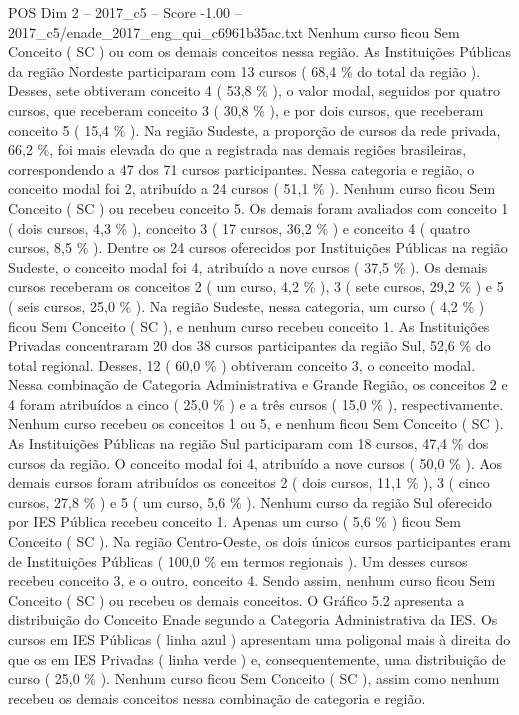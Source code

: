 \begin{textsample}{POS Dim 2 – 2017\_c5 – Score -1.00 – 2017\_c5/enade\_2017\_eng\_qui\_c6961b35ac.txt}
Nenhum curso ficou Sem Conceito ( SC ) ou com os demais conceitos nessa região.
As Instituições Públicas da região Nordeste participaram com 13 cursos ( 68,4 \% do total da região ).
Desses, sete obtiveram conceito 4 ( 53,8 \% ), o valor modal, seguidos por quatro cursos, que receberam conceito 3 ( 30,8 \% ), e por dois cursos, que receberam conceito 5 ( 15,4 \% ).
Na região Sudeste, a proporção de cursos da rede privada, 66,2 \%, foi mais elevada do que a registrada nas demais regiões brasileiras, correspondendo a 47 dos 71 cursos participantes.
Nessa categoria e região, o conceito modal foi 2, atribuído a 24 cursos ( 51,1 \% ).
Nenhum curso ficou Sem Conceito ( SC ) ou recebeu conceito 5.
Os demais foram avaliados com conceito 1 ( dois cursos, 4,3 \% ), conceito 3 ( 17 cursos, 36,2 \% ) e conceito 4 ( quatro cursos, 8,5 \% ).
Dentre os 24 cursos oferecidos por Instituições Públicas na região Sudeste, o conceito modal foi 4, atribuído a nove cursos ( 37,5 \% ).
Os demais cursos receberam os conceitos 2 ( um curso, 4,2 \% ), 3 ( sete cursos, 29,2 \% ) e 5 ( seis cursos, 25,0 \% ).
Na região Sudeste, nessa categoria, um curso ( 4,2 \% ) ficou Sem Conceito ( SC ), e nenhum curso recebeu conceito 1.
As Instituições Privadas concentraram 20 dos 38 cursos participantes da região Sul, 52,6 \% do total regional.
Desses, 12 ( 60,0 \% ) obtiveram conceito 3, o conceito modal.
Nessa combinação de Categoria Administrativa e Grande Região, os conceitos 2 e 4 foram atribuídos a cinco ( 25,0 \% ) e a três cursos ( 15,0 \% ), respectivamente.
Nenhum curso recebeu os conceitos 1 ou 5, e nenhum ficou Sem Conceito ( SC ).
As Instituições Públicas na região Sul participaram com 18 cursos, 47,4 \% dos cursos da região.
O conceito modal foi 4, atribuído a nove cursos ( 50,0 \% ).
Aos demais cursos foram atribuídos os conceitos 2 ( dois cursos, 11,1 \% ), 3 ( cinco cursos, 27,8 \% ) e 5 ( um curso, 5,6 \% ).
Nenhum curso da região Sul oferecido por IES Pública recebeu conceito 1.
Apenas um curso ( 5,6 \% ) ficou Sem Conceito ( SC ).
Na região Centro-Oeste, os dois únicos cursos participantes eram de Instituições Públicas ( 100,0 \% em termos regionais ).
Um desses cursos recebeu conceito 3, e o outro, conceito 4.
Sendo assim, nenhum curso ficou Sem Conceito ( SC ) ou recebeu os demais conceitos.
O Gráfico 5.2 apresenta a distribuição do Conceito Enade segundo a Categoria Administrativa da IES.
Os cursos em IES Públicas ( linha azul ) apresentam uma poligonal mais à direita do que os em IES Privadas ( linha verde ) e, consequentemente, uma distribuição de curso ( 25,0 \% ).
Nenhum curso ficou Sem Conceito ( SC ), assim como nenhum recebeu os demais conceitos nessa combinação de categoria e região.

\end{textsample}
